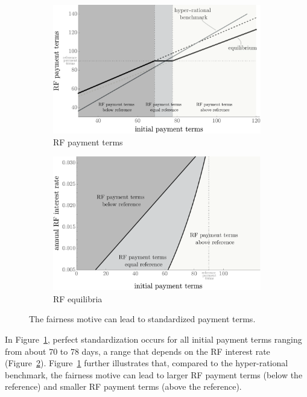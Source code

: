 \documentclass[a4paper,11pt]{article}
\renewcommand{\~}[1]{\tilde{#1}}
\renewcommand{\-}[1]{\overline{#1}}
\begin{document}
\begin{figure}[b]
     \centering
     \begin{subfigure}[b]{0.47\textwidth}
         \centering
         \includegraphics[width=\textwidth]{figures/04_PosteriorTermsFairness.pdf}\vspace{5pt}
         \caption{RF payment terms \vspace{12pt}}
         \label{fig:fair:dr}
     \end{subfigure}
     \hfill
     \begin{subfigure}[b]{0.47\textwidth}
         \centering
         \includegraphics[width=\textwidth]{figures/02_equilibria_fairness.pdf}
         \caption{RF equilibria\vspace{12pt}}
         \label{fig:fair:equilibria}
     \end{subfigure}
        \caption{The fairness motive can lead to standardized payment terms.}
        \label{fig:fair}
\end{figure}%
In Figure~\ref{fig:fair:dr}, perfect standardization occurs for all initial payment terms ranging from about 70 to 78 days, a range that depends on the RF interest rate (Figure~\ref{fig:fair:equilibria}). Figure~\ref{fig:fair:dr} further illustrates that, compared to the hyper-rational benchmark, the fairness motive can lead to larger RF payment terms (below the reference) and smaller RF payment terms (above the reference).
\end{document}
